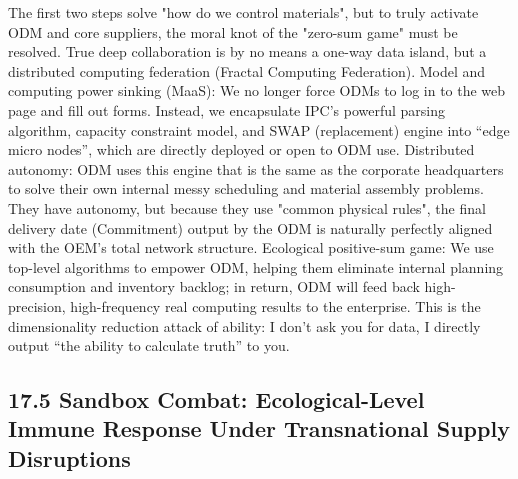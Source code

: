 \documentclass[11pt,a4paper]{article}
\begin{document}
The first two steps solve "how do we control materials", but to truly activate ODM and core suppliers, the moral knot of the "zero-sum game" must be resolved. True deep collaboration is by no means a one-way data island, but a distributed computing federation (Fractal Computing Federation). Model and computing power sinking (MaaS): We no longer force ODMs to log in to the web page and fill out forms. Instead, we encapsulate IPC’s powerful parsing algorithm, capacity constraint model, and SWAP (replacement) engine into “edge micro nodes”, which are directly deployed or open to ODM use. Distributed autonomy: ODM uses this engine that is the same as the corporate headquarters to solve their own internal messy scheduling and material assembly problems. They have autonomy, but because they use "common physical rules", the final delivery date (Commitment) output by the ODM is naturally perfectly aligned with the OEM's total network structure. Ecological positive-sum game: We use top-level algorithms to empower ODM, helping them eliminate internal planning consumption and inventory backlog; in return, ODM will feed back high-precision, high-frequency real computing results to the enterprise. This is the dimensionality reduction attack of ability: I don’t ask you for data, I directly output “the ability to calculate truth” to you.


\subsection*{17.5 Sandbox Combat: Ecological-Level Immune Response Under Transnational Supply Disruptions}
\end{document}
